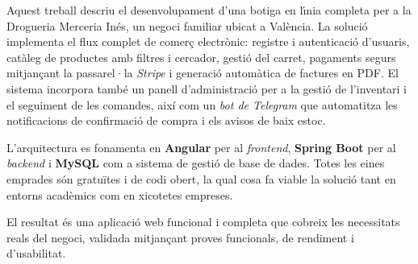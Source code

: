 \documentclass[twoside,spanish,a4paper,12pt]{tfg}
\begin{document}
\begin{resum}
Aquest treball descriu el desenvolupament d{'}una botiga en l{\'\i}nia completa per a la Drogueria Merceria Inés, un negoci familiar ubicat a València. La solució implementa el flux complet de comerç electrònic: registre i autenticació d{'}usuaris, catàleg de productes amb filtres i cercador, gestió del carret, pagaments segurs mitjançant la passarel·la \textit{Stripe} i generació automàtica de factures en PDF. El sistema incorpora també un panell d{'}administració per a la gestió de l{'}inventari i el seguiment de les comandes, així com un \textit{bot de Telegram} que automatitza les notificacions de confirmació de compra i els avisos de baix estoc.

L{'}arquitectura es fonamenta en \textbf{Angular} per al \textit{frontend}, \textbf{Spring Boot} per al \textit{backend} i \textbf{MySQL} com a sistema de gestió de base de dades. Totes les eines emprades són gratuïtes i de codi obert, la qual cosa fa viable la solució tant en entorns acadèmics com en xicotetes empreses.

El resultat és una aplicació web funcional i completa que cobreix les necessitats reals del negoci, validada mitjançant proves funcionals, de rendiment i d{'}usabilitat.
\end{resum}
\cleardoublepage
\end{document}

